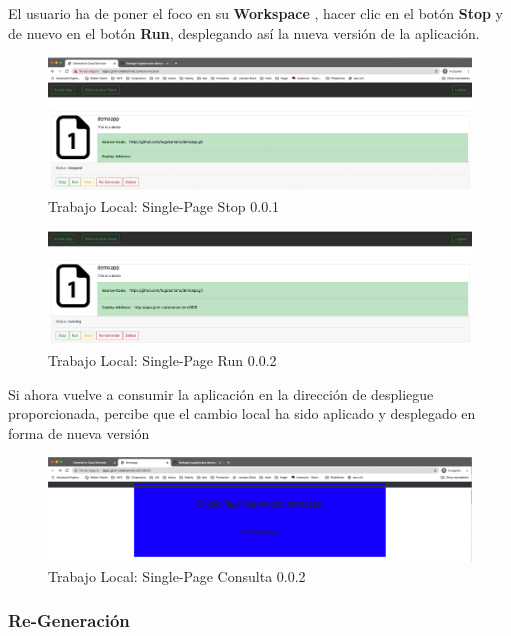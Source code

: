 \documentclass[a4paper,11pt]{book}
\begin{document}
 El usuario ha de poner el foco en su \textbf{Workspace} , hacer clic en el botón \textbf{Stop} y de nuevo en el botón \textbf{Run}, desplegando así la nueva versión de la aplicación. 
 
\begin{figure}[H]
\centering
\includegraphics[scale=0.25]{imagenes/casouso/3_9_a.png}
\caption{ Trabajo Local: Single-Page Stop 0.0.1    }
\end{figure}
 
 
   \begin{figure}[H]
\centering
\includegraphics[scale=0.25]{imagenes/casouso/3_10_a.png}
\caption{  Trabajo Local: Single-Page Run 0.0.2 }
\end{figure}
 
 Si ahora vuelve a consumir la aplicación en la dirección de despliegue proporcionada, percibe que el cambio local ha sido aplicado y desplegado en forma de nueva versión
 
 
   \begin{figure}[H]
\centering
\includegraphics[scale=0.25]{imagenes/casouso/3_11_a.png}
\caption{   Trabajo Local: Single-Page Consulta 0.0.2}
\end{figure}


\subsubsection{Re-Generación}
\end{document}
